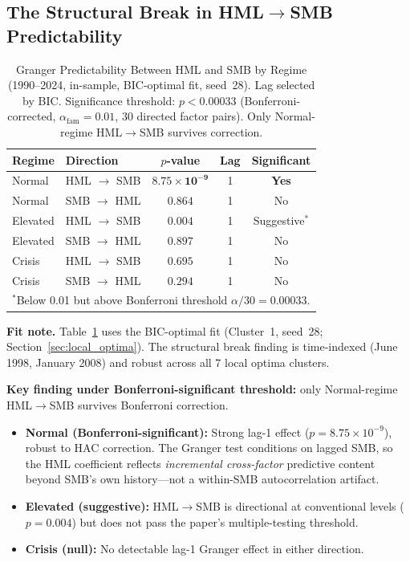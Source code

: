 \documentclass[sigconf,anonymous]{acmart}
\begin{document}
\subsection{The Structural Break in HML$\to$SMB Predictability}
\label{sec:main_result}

\begin{table}[t]
\centering
\caption{Granger Predictability Between HML and SMB by Regime (1990--2024, in-sample,
BIC-optimal fit, seed~28). Lag selected by BIC. Significance threshold:
$p < 0.00033$ (Bonferroni-corrected, $\alpha_{\text{fam}} = 0.01$, 30 directed factor pairs).
Only Normal-regime HML$\to$SMB survives correction.}
\label{tab:main}
\small
\begin{tabular}{llccc}
\toprule
Regime & Direction & $p$-value & Lag & Significant \\
\midrule
Normal & HML $\to$ SMB & $\mathbf{8.75 \times 10^{-9}}$ & 1 & \textbf{Yes} \\
Normal & SMB $\to$ HML & $0.864$ & 1 & No \\
\midrule
Elevated & HML $\to$ SMB & $0.004$ & 1 & Suggestive$^*$ \\
Elevated & SMB $\to$ HML & $0.897$ & 1 & No \\
\midrule
Crisis & HML $\to$ SMB & $0.695$ & 1 & No \\
Crisis & SMB $\to$ HML & $0.294$ & 1 & No \\
\bottomrule
\multicolumn{5}{l}{\footnotesize $^*$Below 0.01 but above Bonferroni threshold $\alpha/30 = 0.00033$.}
\end{tabular}
\end{table}

\textbf{Fit note.} Table~\ref{tab:main} uses the BIC-optimal fit (Cluster~1, seed~28; Section~\ref{sec:local_optima}). The structural break finding is time-indexed (June 1998, January 2008) and robust across all 7 local optima clusters.

\textbf{Key finding under Bonferroni-significant threshold:} only Normal-regime
HML$\to$SMB survives Bonferroni correction.
\begin{itemize}
    \item \textbf{Normal (Bonferroni-significant):} Strong lag-1 effect
    ($p = 8.75 \times 10^{-9}$), robust to HAC correction. The Granger test conditions
    on lagged SMB, so the HML coefficient reflects \emph{incremental cross-factor}
    predictive content beyond SMB's own history---not a within-SMB autocorrelation artifact.
    \item \textbf{Elevated (suggestive):} HML$\to$SMB is directional at
    conventional levels ($p = 0.004$) but does not pass the paper's
    multiple-testing threshold.
    \item \textbf{Crisis (null):} No detectable lag-1 Granger effect in either
    direction.
\end{itemize}
\end{document}
